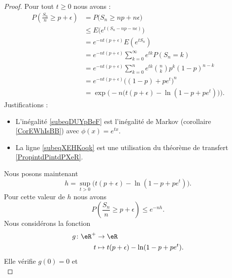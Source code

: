 \begin{proof}
    Pour tout \( t\geq 0\) nous avons :
    \begin{subequations}
        \begin{align}
        P\left( \frac{ S_n }{ n }\geq p+\epsilon \right)&=P\big( S_n\geq np+n\epsilon \big)\\
        &\leq E\Big(  e^{t(S_n-np-n\epsilon)} \Big)        \label{subeqDUYpBeF}\\
        &= e^{-nt(p+\epsilon)}E\left(  e^{tS_n} \right)\\
        &= e^{-nt(p+\epsilon)}\sum_{k=0}^{\infty} e^{tk}P(S_n=k)    \label{subeqXEHKoqk}\\
        &= e^{-nt(p+\epsilon)}\sum_{k=0}^{n} e^{tk}\binom{n}{k}p^k(1-p)^{n-k}\\
        &= e^{-nt(p+\epsilon)}\big( (1-p)+pe^t \big)^n\\
        &=\exp\Big( -n\big( t(p+\epsilon)-\ln(1-p+pe^t) \big) \Big).
        \end{align}
    \end{subequations}
    Justifications :
    \begin{itemize}
        \item
            L'inégalité \eqref{subeqDUYpBeF} est l'inégalité de Markov (corollaire \ref{CorEWhIsBB}) avec \( \phi(x)= e^{tx}\). 
        \item 
    La ligne \eqref{subeqXEHKoqk} est une utilisation du théorème de transfert \ref{PropintdPintdPXeR}.
    \end{itemize}
    Nous posons maintenant
    \begin{equation}
        h=\sup_{t>0}\big( t(p+\epsilon)-\ln(1-p+pe^t) \big).
    \end{equation}
    Pour cette valeur de \( h\) nous avons
    \begin{equation}
        P\left( \frac{ S_n }{ n }\geq p+\epsilon \right)\leq e^{-nh}.
    \end{equation}
    Nous considérons la fonction
    \begin{equation}
        \begin{aligned}
            g\colon \eR^+&\to \eR \\
            t&\mapsto t(p+\epsilon)-\ln(1-p+pe^t). 
        \end{aligned}
    \end{equation}
    Elle vérifie \( g(0)=0\) et
    \begin{subequations}

\end{subequations}
\end{proof}
